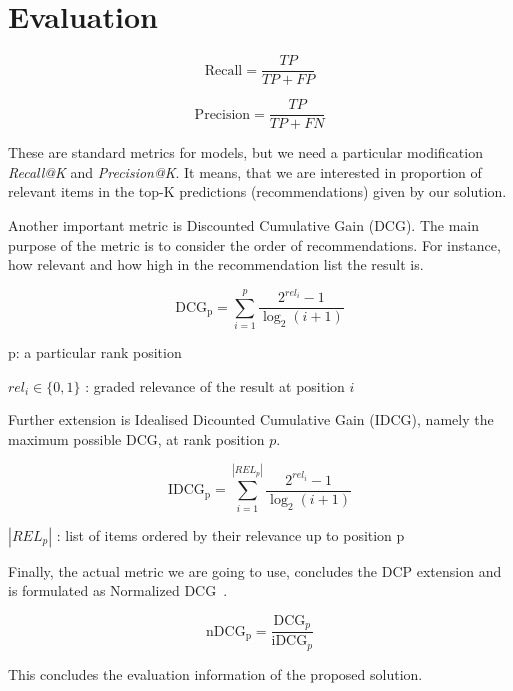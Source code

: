 \section{Evaluation}

\begin{equation}
    \text{Recall} = \frac{TP}{TP + FP}
\end{equation}

\begin{equation}
    \text{Precision} = \frac{TP}{TP + FN}
\end{equation}

These are standard metrics for models, but we need a particular modification
\textit{Recall@K} and \textit{Precision@K}. It means, that we are interested in
proportion of relevant items in the top-K predictions (recommendations) given
by our solution.

Another important metric is Discounted Cumulative Gain (DCG). The main purpose
of the metric is to consider the order of recommendations. For instance, how
relevant and how high in the recommendation list the result is.

\begin{equation}
    \text{DCG}_\text{p} = \sum_{i = 1}^p \frac{2^{rel_i} - 1}{\log_2{(i + 1)}}
\end{equation}

p: a particular rank position

$rel_i \in \{0, 1\}$ : graded relevance of the result at position $i$

Further extension is Idealised Dicounted Cumulative Gain (IDCG), namely the
maximum possible DCG, at rank position $p$.

\begin{equation}
    \text{IDCG}_\text{p} = \sum_{i = 1}^{|REL_p|} \frac{2^{rel_i} - 1}{\log_2{(i + 1)}}
\end{equation}

$|REL_p|$ : list of items ordered by their relevance up to position p

Finally, the actual metric we are going to use, concludes the DCP extension and
is formulated as Normalized
DCG~\cite{jeunenNormalisedDiscountedCumulative2023}\@.

\begin{equation}
    \text{nDCG}_\text{p} = \frac{\text{DCG}_p}{\text{iDCG}_p}
\end{equation}

This concludes the evaluation information of the proposed solution.